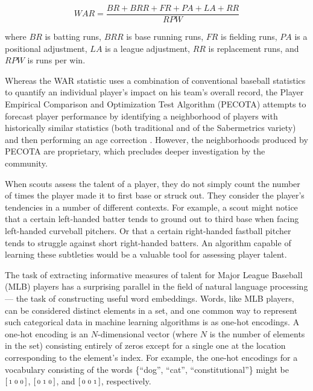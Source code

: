 \documentclass{article}
\begin{document}
\begin{equation}
\label{eqn:war}
WAR = \frac{BR + BRR + FR + PA + LA + RR}{RPW}
\end{equation}

where $BR$ is batting runs, $BRR$ is base running runs, $FR$ is fielding runs, $PA$ is a positional adjustment, $LA$ is a league adjustment, $RR$ is replacement runs, and $RPW$ is runs per win.

Whereas the WAR statistic uses a combination of conventional baseball statistics to quantify an individual player's impact on his team's overall record, the Player Empirical Comparison and Optimization Test Algorithm (PECOTA) attempts to forecast player performance by identifying a neighborhood of players with historically similar statistics (both traditional and of the Sabermetrics variety) and then performing an age correction \parencite{PECOTA}. However, the neighborhoods produced by PECOTA are proprietary, which precludes deeper investigation by the community.

When scouts assess the talent of a player, they do not simply count the number of times the player made it to first base or struck out. They consider the player's tendencies in a number of different contexts. For example, a scout might notice that a certain left-handed batter tends to ground out to third base when facing left-handed curveball pitchers. Or that a certain right-handed fastball pitcher tends to struggle against short right-handed batters. An algorithm capable of learning these subtleties would be a valuable tool for assessing player talent.

The task of extracting informative measures of talent for Major League Baseball (MLB) players has a surprising parallel in the field of natural language processing --- the task of constructing useful word embeddings. Words, like MLB players, can be considered distinct elements in a set, and one common way to represent such categorical data in machine learning algorithms is as one-hot encodings. A one-hot encoding is an $N$-dimensional vector (where $N$ is the number of elements in the set) consisting entirely of zeros except for a single one at the location corresponding to the element's index. For example, the one-hot encodings for a vocabulary consisting of the words \{``dog'', ``cat'', ``constitutional''\} might be $\begin{bsmallmatrix} 1 & 0 & 0 \end{bsmallmatrix}$, $\begin{bsmallmatrix} 0 & 1 & 0 \end{bsmallmatrix}$, and $\begin{bsmallmatrix} 0 & 0 & 1 \end{bsmallmatrix}$, respectively.
\end{document}
